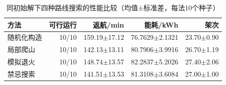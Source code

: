 \begin{table}[H]\centering\normalsize
\caption{同初始解下四种路线搜索的性能比较（均值±标准差，每法10个种子）}\label{tab:q2_formal_protocol}
\begin{tabular}{lrrrr}
\toprule
方法 & 可行运行 & 返航/min & 能耗/kWh & 架次\\\midrule
随机化构造 & 10/10 & 159.19$\pm$17.12 & 76.7629$\pm$2.1321 & 23.70$\pm$0.90\\
局部爬山 & 10/10 & 142.13$\pm$13.11 & 80.7906$\pm$3.9916 & 26.70$\pm$1.19\\
模拟退火 & 10/10 & 148.74$\pm$13.57 & 82.2837$\pm$5.2026 & 27.40$\pm$2.06\\
禁忌搜索 & 10/10 & 141.51$\pm$13.53 & 81.3108$\pm$3.6084 & 27.00$\pm$1.00\\
\bottomrule\end{tabular}
\end{table}
